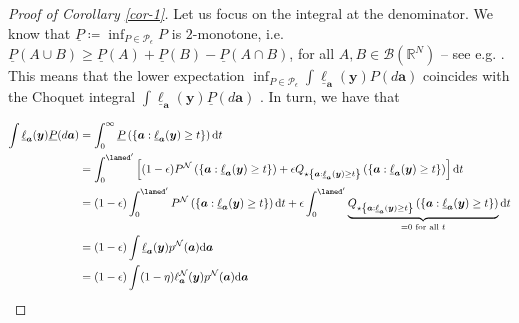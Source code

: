 \documentclass[12pt, english, oneside, a4paper]{article}
\newcommand{\y}{\boldsymbol{y}}
\newcommand{\X}{\boldsymbol{X}}
\renewcommand{\a}{\boldsymbol{a}}
\newcommand{\bT}{\boldsymbol{\Theta}}
\begin{document}
\begin{proof}[Proof of Corollary \ref{cor-1}]
    
    Let us focus on the integral at the denominator. We know that $\underline{P}\coloneqq \inf_{P\in\mathcal{P}_\epsilon}P$ is $2$-monotone, i.e. $\underline{P}(A \cup B) \geq \underline{P}(A)+\underline{P}(B)-\underline{P}(A \cap B)$, for all $A,B \in \mathcal{B}(\mathbb{R}^N)$ -- see e.g. \citet{wasserman,novel_Bayes}. This means that the lower expectation $\inf_{P\in\mathcal{P}_\epsilon} \int \underline{\ell}_{\a}(\y) P(d\a)$ coincides with the Choquet integral $\int \underline{\ell}_{\a}(\y) \underline{P}(d\a)$ \citep{cerreia}. In turn, we have that

\begin{align*}
        \int \underline{\ell}_{\a}(\y) \underline{P}(d\a) &= \int_0^\infty \underline{P} \left( \left\lbrace{\a : \underline{\ell}_{\a}(\y) \geq t}\right\rbrace \right) \text{d}t\\
        &= \int_0^{\lamed^\prime} \left[ (1-\epsilon) P^\mathcal{N}\left( \left\lbrace{\a : \underline{\ell}_{\a}(\y) \geq t}\right\rbrace \right) + \epsilon Q_{\star\left\lbrace{\a : \underline{\ell}_{\a}(\y) \geq t}\right\rbrace} \left( \left\lbrace{\a : \underline{\ell}_{\a}(\y) \geq t}\right\rbrace \right) \right] \text{d}t \\
        &=(1-\epsilon)\int_0^{\lamed^\prime} P^\mathcal{N}\left( \left\lbrace{\a : \underline{\ell}_{\a}(\y) \geq t}\right\rbrace \right) \text{d}t  + \epsilon \int_0^{\lamed^\prime} \underbrace{Q_{\star\left\lbrace{\a : \underline{\ell}_{\a}(\y) \geq t}\right\rbrace} \left( \left\lbrace{\a : \underline{\ell}_{\a}(\y) \geq t}\right\rbrace \right)}_{=0 \text{ for all } t} \text{d}t\\
        &=(1-\epsilon) \int \underline{\ell}_{\a}(\y) p^\mathcal{N}(\a) \text{d}\a \\
        &=(1-\epsilon) \int (1-\eta) \ell^\mathcal{N}_{\a}(\y)  p^\mathcal{N}(\a)  \text{d}\a\\

\end{align*}
\end{proof}
\end{document}
